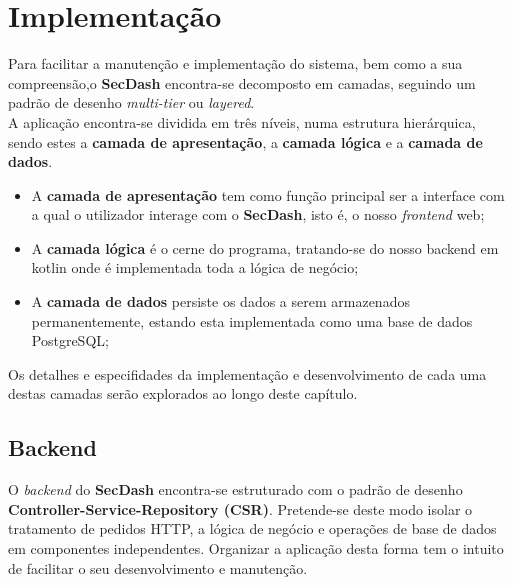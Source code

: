 \chapter{Implementação} \label{cap:implementacao}

Para facilitar a manutenção e implementação do sistema, bem como a sua compreensão,o \textbf{SecDash} encontra-se decomposto em camadas, seguindo um padrão de desenho \textit{multi-tier} ou \textit{layered}. \\

A aplicação encontra-se dividida em três níveis, numa estrutura hierárquica, sendo estes a \textbf{camada de apresentação}, a \textbf{camada lógica} e a \textbf{camada de dados}. \\

\begin{itemize}
	\item A \textbf{camada de apresentação} tem como função principal ser a interface com a qual o utilizador interage com o \textbf{SecDash}, isto é, o nosso \textit{frontend} web;

	\item A \textbf{camada lógica} é o cerne do programa, tratando-se do nosso backend em kotlin onde é implementada toda a lógica de negócio;

	\item A \textbf{camada de dados} persiste os dados a serem armazenados permanentemente, estando esta implementada como uma base de dados PostgreSQL; 
\end{itemize}

Os detalhes e especifidades da implementação e desenvolvimento de cada uma destas camadas serão explorados ao longo deste capítulo. \\


\section{Backend} \label{implementacao:backend}
O \textit{backend} do \textbf{SecDash} encontra-se estruturado com o padrão de desenho \textbf{Controller-Service-Repository (CSR)}. Pretende-se deste modo isolar o tratamento de pedidos HTTP, a lógica de negócio e operações de base de dados em componentes independentes. Organizar a aplicação desta forma tem o intuito de facilitar o seu desenvolvimento e manutenção. \\

